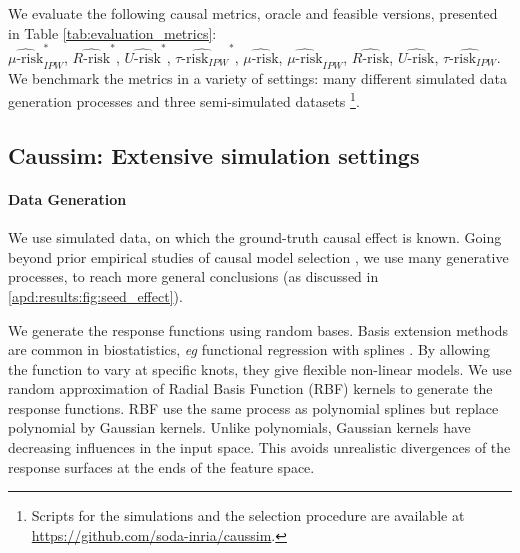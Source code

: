 \documentclass{report}
\begin{document}

We evaluate the following causal metrics, oracle and feasible
versions, presented in Table
\ref{tab:evaluation_metrics}:\\
$\widehat{\mu\text{-risk}}_{IPW}^*$,
$\widehat{R\text{-risk}}^*$,
$\widehat{U\text{-risk}}^*$,
$\widehat{\tau\text{-risk}_{IPW}}^*$,
$\widehat{\mu\text{-risk}}$,
$\widehat{\mu\text{-risk}}_{IPW}$,
$\widehat{R\text{-risk}}$,
$\widehat{U\text{-risk}}$,
$\widehat{\tau\text{-risk}_{IPW}}$.
We benchmark the metrics in a variety of settings:
many different simulated data generation
processes and three semi-simulated datasets \footnote{Scripts for the simulations and the selection procedure are available at
  \url{https://github.com/soda-inria/caussim}.
}.

\subsection{Caussim: Extensive simulation settings}\label{subsec:simulations}

\paragraph{Data Generation}

We use simulated data, on which the ground-truth causal effect is known. Going
beyond prior empirical studies of causal model selection
\citep{schuler_comparison_2018,alaa_validating_2019}, we use many
generative processes, to reach more general conclusions (as discussed
in \ref{apd:results:fig:seed_effect}).

We generate the response functions using random bases. Basis extension methods
are common in biostatistics, \emph{eg} functional regression with splines
\citep{howe_splines_2011, perperoglou_review_2019}. By allowing the function to
vary at specific knots, they give flexible non-linear models. We use random approximation of Radial Basis Function (RBF) kernels
\citep{rahimi_random_2008} to generate the response functions. RBF use the same
process as polynomial splines but replace polynomial by Gaussian kernels. Unlike
polynomials, Gaussian kernels have decreasing influences in the input space.
This avoids unrealistic divergences of the response surfaces at the
ends of the feature space.
\end{document}
